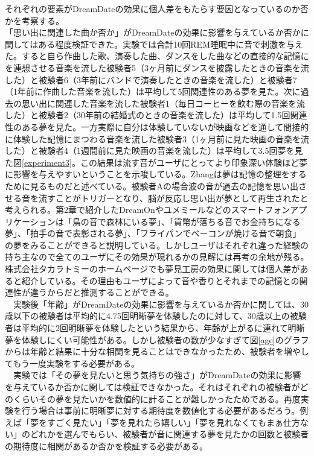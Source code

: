それぞれの要素がDreamDateの効果に個人差をもたらす要因となっているのか否かを考察する。\\
「思い出に関連した曲か否か」がDreamDateの効果に影響を与えているか否かに関してはある程度検証できた。実験では合計10回REM睡眠中に音で刺激を与えた。すると自ら作曲した歌、演奏した曲、ダンスをした曲などの直接的な記憶にを連想させる音楽を流した被験者5（3ヶ月前にダンスを披露したときの音楽を流した）と被験者6（3年前にバンドで演奏したときの音楽を流した）と被験者7（1年前に作曲した音楽を流した）は平均して5回関連性のある夢を見た。次に過去の思い出に関連した音楽を流した被験者1（毎日コーヒーを飲む際の音楽を流した）と被験者2（30年前の結婚式のときの音楽を流した）は平均して1.5回関連性のある夢を見た。一方実際に自分は体験していないが映画などを通して間接的に体験した記憶にまつわる音楽を流した被験者3（1ヶ月前に見た映画の音楽を流した）と被験者4（1週間前に見た映画の音楽を流した）は平均して3.5回夢を見た図\ref{experiment3}。この結果は流す音がユーザにとってより印象深い体験ほど夢に影響を与えやすいということを示唆している。Zhangは夢は記憶の整理をするために見るものだと述べている\cite{Zhang}。被験者Aの場合波の音が過去の記憶を思い出させる音を流すことがトリガーとなり、脳が反応し思い出が夢として再生されたと考えられる。第2章で紹介したDreamOnやユメミールなどのスマートフォンアプリケーションは「鳥の音で森林にいる夢」、「貨幣が落ちる音でお金持ちになる夢」、「拍手の音で表彰される夢」、「フライパンでベーコンが焼ける音で朝食」の夢をみることができると説明している。しかしユーザはそれぞれ違った経験の持ち主なので全てのユーザにその効果が現れるかの見解には再考の余地が残る。株式会社タカラトミーのホームページでも夢見工房の効果に関しては個人差があると紹介している。その理由もユーザによって音や香りとそれまでの記憶との関連性が違うからだと推測することができる。\\
　実験後「年齢」がDreamDateの効果に影響を与えているか否かに関しては、30歳以下の被験者は平均的に4.75回明晰夢を体験したのに対して、30歳以上の被験者は平均的に2回明晰夢を体験したという結果から、年齢が上がるに連れて明晰夢を体験しにくい可能性がある。しかし被験者の数が少なすぎて図\ref{age}のグラフからは年齢と結果に十分な相関を見ることはできなかったため、被験者を増やしてもう一度実験をする必要がある。\\
　実験では「その夢を見たいと思う気持ちの強さ」がDreamDateの効果に影響を与えているか否かに関しては検証できなかった。それはそれぞれの被験者がどのくらいその夢を見たいかを数値的に計ることが難しかったためである。再度実験を行う場合は事前に明晰夢に対する期待度を数値化する必要があるだろう。例えば「夢をすごく見たい」「夢を見れたら嬉しい」「夢を見れなくてもまぁ仕方ない」のどれかを選んでもらい、被験者が音に関連する夢を見たかの回数と被験者の期待度に相関があるか否かを検証する必要がある。\\ 
